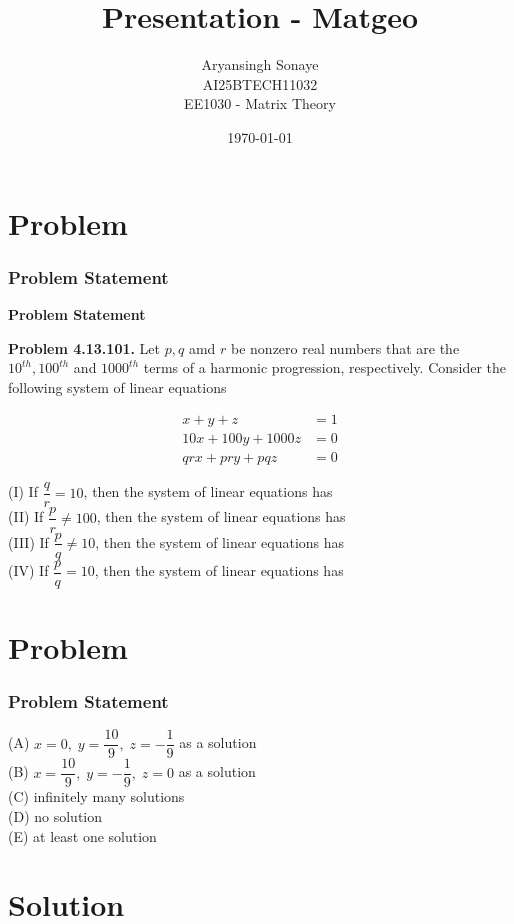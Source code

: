 \documentclass{beamer}
\title{Presentation - Matgeo}
\author{Aryansingh Sonaye \\
AI25BTECH11032 \\
EE1030 - Matrix Theory}
\date{\today}
\theoremstyle{remark}
\numberwithin{equation}{section}
\begin{document}
\begin{frame}
\titlepage
\end{frame}

\section{Problem}
\begin{frame}
\frametitle{Problem Statement}
\textbf{Problem Statement}

\textbf{Problem 4.13.101.} Let $p, q$ amd $r$ be nonzero real numbers that are the $10^{th}, 100^{th}$ and $1000^{th}$ terms of a harmonic progression, respectively. Consider the following system of linear equations

\begin{align}
x + y + z &= 1 \\
10x + 100y + 1000z &= 0 \\
qrx + pry + pqz &= 0
\end{align}

(I) If $\dfrac{q}{r} = 10$, then the system of linear equations has\\
(II) If $\dfrac{p}{r} \neq 100$, then the system of linear equations has\\
(III) If $\dfrac{p}{q} \neq 10$, then the system of linear equations has\\
(IV) If $\dfrac{p}{q} = 10$, then the system of linear equations has

\end{frame}

\section{Problem}
\begin{frame}
\frametitle{Problem Statement}

(A) $x = 0,\; y = \dfrac{10}{9},\; z = -\dfrac{1}{9}$ as a solution\\
(B) $x = \dfrac{10}{9},\; y = -\dfrac{1}{9},\; z = 0$ as a solution\\
(C) infinitely many solutions\\
(D) no solution\\
(E) at least one solution

\end{frame}

\section{Solution}
\end{document}
